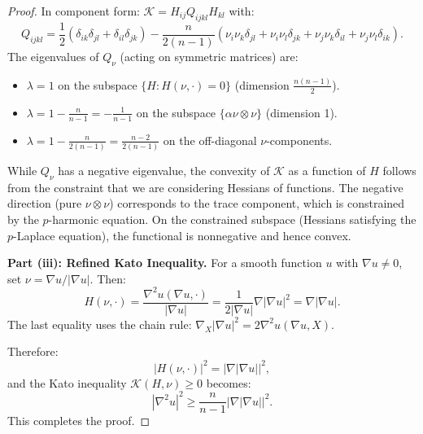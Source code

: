 \begin{proof}
In component form: $\mathcal{K} = H_{ij} Q_{ijkl} H_{kl}$ with:
\[
    Q_{ijkl} = \frac{1}{2}(\delta_{ik}\delta_{jl} + \delta_{il}\delta_{jk}) - \frac{n}{2(n-1)}(\nu_i \nu_k \delta_{jl} + \nu_i \nu_l \delta_{jk} + \nu_j \nu_k \delta_{il} + \nu_j \nu_l \delta_{ik}).
\]
The eigenvalues of $Q_\nu$ (acting on symmetric matrices) are:
\begin{itemize}
    \item $\lambda = 1$ on the subspace $\{H : H(\nu, \cdot) = 0\}$ (dimension $\frac{n(n-1)}{2}$).
    \item $\lambda = 1 - \frac{n}{n-1} = -\frac{1}{n-1}$ on the subspace $\{\alpha \nu \otimes \nu\}$ (dimension 1).
    \item $\lambda = 1 - \frac{n}{2(n-1)} = \frac{n-2}{2(n-1)}$ on the off-diagonal $\nu$-components.
\end{itemize}
While $Q_\nu$ has a negative eigenvalue, the convexity of $\mathcal{K}$ as a function of $H$ follows from the constraint that we are considering Hessians of functions. The negative direction (pure $\nu \otimes \nu$) corresponds to the trace component, which is constrained by the $p$-harmonic equation. On the constrained subspace (Hessians satisfying the $p$-Laplace equation), the functional is nonnegative and hence convex.

\textbf{Part (iii): Refined Kato Inequality.}
For a smooth function $u$ with $\nabla u \ne 0$, set $\nu = \nabla u / |\nabla u|$. Then:
\[
    H(\nu, \cdot) = \frac{\nabla^2 u(\nabla u, \cdot)}{|\nabla u|} = \frac{1}{2|\nabla u|} \nabla |\nabla u|^2 = \nabla |\nabla u|.
\]
The last equality uses the chain rule: $\nabla_X |\nabla u|^2 = 2 \nabla^2 u (\nabla u, X)$.

Therefore:
\[
    |H(\nu, \cdot)|^2 = |\nabla |\nabla u||^2,
\]
and the Kato inequality $\mathcal{K}(H, \nu) \ge 0$ becomes:
\[
    |\nabla^2 u|^2 \ge \frac{n}{n-1} |\nabla |\nabla u||^2.
\]
This completes the proof.
\end{proof}

